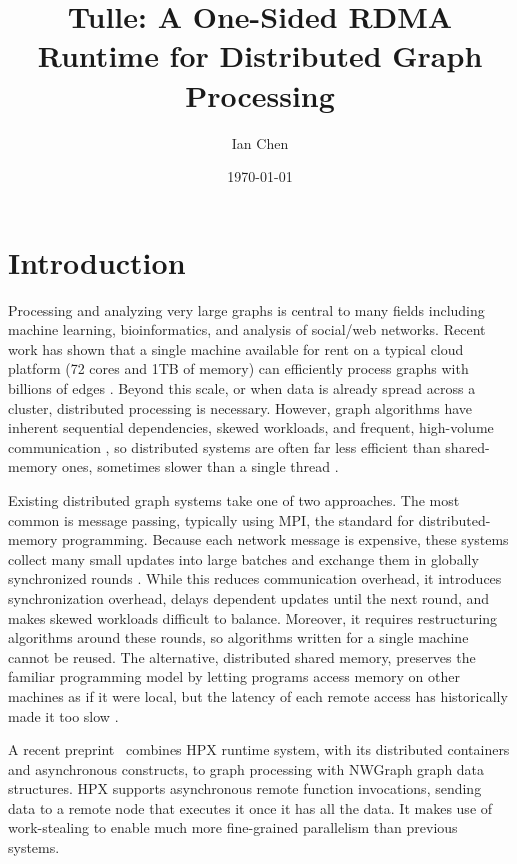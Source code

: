 \documentclass{article}
\title{Tulle: A One-Sided RDMA Runtime for Distributed Graph Processing}
\author{Ian Chen}
\date{\today}
\begin{document}
\maketitle

\section{Introduction}

Processing and analyzing very large graphs is central to many fields including machine learning, bioinformatics, and analysis of social/web networks.
Recent work has shown that a single machine available for rent on a typical cloud platform (72 cores and 1TB of memory) can efficiently process graphs with billions of edges \cite{dhulipala2021theoretically}.
Beyond this scale, or when data is already spread across a cluster, distributed processing is necessary.
However, graph algorithms have inherent sequential dependencies, skewed workloads, and frequent, high-volume communication \cite{meng2024survey}, so distributed systems are often far less efficient than shared-memory ones, sometimes slower than a single thread \cite{mcsherry2015scalability}.

Existing distributed graph systems take one of two approaches.
The most common is message passing, typically using MPI, the standard for distributed-memory programming.
Because each network message is expensive, these systems collect many small updates into large batches and exchange them in globally synchronized rounds \cite{dathathri2018gluon,zhu2016gemini}.
While this reduces communication overhead, it introduces synchronization overhead, delays dependent updates until the next round, and makes skewed workloads difficult to balance.
Moreover, it requires restructuring algorithms around these rounds, so algorithms written for a single machine cannot be reused.
The alternative, distributed shared memory, preserves the familiar programming model by letting programs access memory on other machines as if it were local, but the latency of each remote access has historically made it too slow \cite{nelson2014grappa}.

A recent preprint~\cite{mohammadiporshokooh2026overcoming} combines HPX runtime system, with its distributed containers and asynchronous constructs, to graph processing with NWGraph graph data structures.
HPX supports asynchronous remote function invocations, sending data to a remote node that executes it once it has all the data.
It makes use of work-stealing to enable much more fine-grained parallelism than previous systems.
\end{document}

